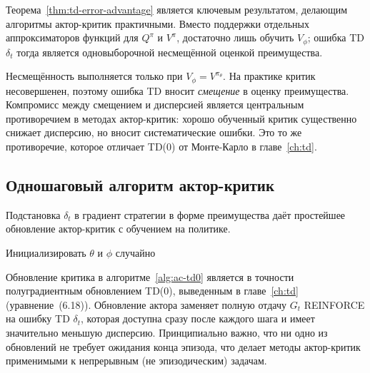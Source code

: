 Теорема~\ref{thm:td-error-advantage} является ключевым результатом, делающим алгоритмы актор-критик практичными. Вместо поддержки отдельных аппроксиматоров функций для $Q^\pi$ и $V^\pi$, достаточно лишь обучить $V_\phi$; ошибка TD $\delta_t$ тогда является одновыборочной несмещённой оценкой преимущества.

\begin{remark}
Несмещённость выполняется только при $V_\phi = V^{\pi_\theta}$. На практике критик несовершенен, поэтому ошибка TD вносит \emph{смещение} в оценку преимущества. Компромисс между смещением и дисперсией является центральным противоречием в методах актор-критик: хорошо обученный критик существенно снижает дисперсию, но вносит систематические ошибки. Это то же противоречие, которое отличает TD(0) от Монте-Карло в главе~\ref{ch:td}.
\end{remark}

\subsection{Одношаговый алгоритм актор-критик}

Подстановка $\delta_t$ в градиент стратегии в форме преимущества даёт простейшее обновление актор-критик с обучением на политике.

\begin{algorithm}[ht]
\caption{Одношаговый актор-критик с обучением на политике (критик TD(0))}
\label{alg:ac-td0}
\DontPrintSemicolon
{}
Инициализировать $\theta$ и $\phi$ случайно\;
\end{algorithm}

Обновление критика в алгоритме~\ref{alg:ac-td0} является в точности полуградиентным обновлением TD(0), выведенным в главе~\ref{ch:td} (уравнение~(6.18)). Обновление актора заменяет полную отдачу $G_t$ REINFORCE на ошибку TD $\delta_t$, которая доступна сразу после каждого шага и имеет значительно меньшую дисперсию. Принципиально важно, что ни одно из обновлений не требует ожидания конца эпизода, что делает методы актор-критик применимыми к непрерывным (не эпизодическим) задачам.

